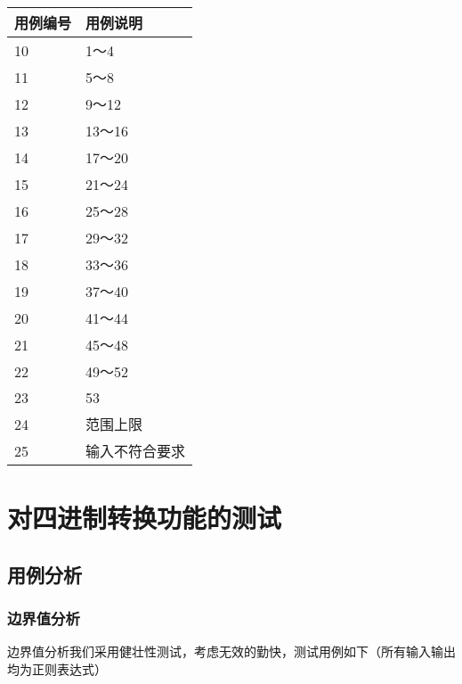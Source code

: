 \documentclass[12pt, a4paper, oneside]{ctexart}
\begin{document}
\newpage
\begin{table}[!h]
    \begin{tabular}{|l|l|}
    \hline
    用例编号 & 用例说明\\ \hline
    10 & 1～4\\ \hline
    11 & 5～8 \\ \hline
    12 & 9～12 \\ \hline
    13 & 13～16 \\ \hline
    14 & 17～20 \\ \hline
    15 & 21～24 \\ \hline
    16 & 25～28 \\ \hline
    17 & 29～32  \\ \hline
    18 & 33～36 \\ \hline
    19 & 37～40 \\ \hline
    20 & 41～44 \\ \hline
    21 & 45～48 \\ \hline
    22 & 49～52 \\ \hline
    23 & 53 \\ \hline
    24 & 范围上限 \\ \hline
    25 & 输入不符合要求 \\ \hline

    \end{tabular}
\end{table}





\section{对四进制转换功能的测试}

\subsection{用例分析}

\subsubsection{边界值分析}
边界值分析我们采用健壮性测试，考虑无效的勤快，测试用例如下（所有输入输出均为正则表达式）
\end{document}
